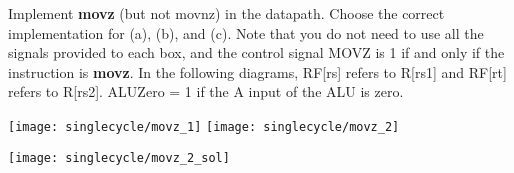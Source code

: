 \begin{blocksection}

\question
Implement \textbf{movz} (but not movnz) in the datapath. Choose the correct implementation for (a), (b), and (c). Note that you do not need to use all the signals provided to each box, and the control signal MOVZ is 1 if and only if the instruction is \textbf{movz}. In the following diagrams, RF[rs] refers to R[rs1] and RF[rt] refers to R[rs2]. ALUZero = 1 if the A input of the ALU is zero.


\texttt{[image: singlecycle/movz\_1]}
\texttt{[image: singlecycle/movz\_2]}


\begin{solution}[0.5in]
 \texttt{[image: singlecycle/movz\_2\_sol]}
\end{solution}

\end{blocksection}
